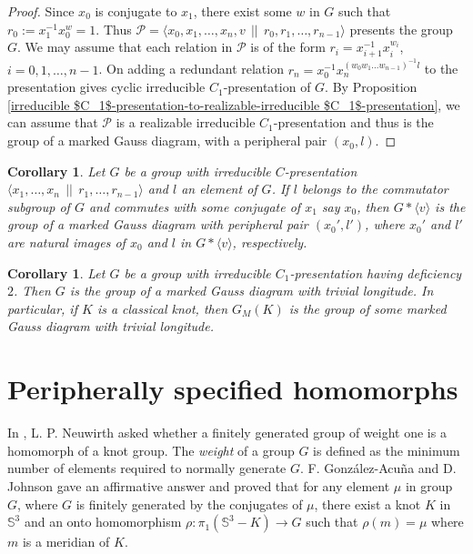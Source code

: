 \documentclass[11 pt, reqno]{amsart}
\newtheorem{corollary}[theorem]{Corollary}
\theoremstyle{definition}
\numberwithin{equation}{subsection}
\begin{document}
\begin{proof}
Since $x_0$ is conjugate to $x_1$, there exist some $w$ in $G$ such that $r_0:=x_1^{-1}x_0^{w}=1$. Thus $\mathcal{P}=\langle x_0,x_1, \ldots, x_n, v~~||~~r_0,r_1, \ldots, r_{n-1} \rangle$ presents the group $G$. We may assume that each relation in $\mathcal{P}$ is of the form $r_i=x_{i+1}^{-1}x_i^{w_i}$, $i=0,1, \ldots, n-1$. On adding a redundant relation $r_n=x_0^{-1}x_n^{(w_0 w_1 \ldots w_{n-1})^{-1}l}$ to the presentation gives cyclic irreducible $C_1$-presentation of $G$. By Proposition \ref{irreducible $C_1$-presentation-to-realizable-irreducible $C_1$-presentation}, we can assume that $\mathcal{P}$ is a realizable irreducible $C_1$-presentation and thus is the group of a marked Gauss diagram, with a peripheral pair $(x_0, l)$.
\end{proof}

\begin{corollary}
Let $G$ be a group with irreducible $C$-presentation $\langle x_1, \ldots, x_n~~||~~r_1, \ldots, r_{n-1} \rangle$ and $l$ an element of $G$. If $l$ belongs to the commutator subgroup of $G$ and commutes with some conjugate of $x_1$ say $x_0$, then $G * \langle v \rangle$ is the group of a marked Gauss diagram with peripheral pair $(x_0', l')$, where $x_0'$ and $l'$ are natural images of $x_0$ and $l$ in $G * \langle v \rangle$, respectively.
\end{corollary}

\begin{corollary}
Let $G$ be a group with irreducible $C_1$-presentation having deficiency $2$. Then $G$ is the group of a marked Gauss diagram with trivial longitude. In particular, if $K$ is a classical knot, then $G_M(K)$ is the group of some marked Gauss diagram with trivial longitude.
\end{corollary}



\section{Peripherally specified homomorphs}\label{S: Peripherally specified homomorphs}
In \cite{Neuwirth-1}, L. P. Neuwirth asked whether a finitely generated group of weight one is a homomorph of a knot group. The {\it weight} of a group $G$ is defined as the minimum number of elements required to normally generate $G$. F. Gonz{\'a}lez-Acu{\~n}a \cite{Acuna-1} and D. Johnson \cite{Johnson-1} gave an affirmative answer and proved that for any element $\mu$ in group $G$, where $G$ is finitely generated by the conjugates of $\mu$, there exist a knot $K$ in $\mathbb{S}^3$  and an onto homomorphism $\rho: \pi_1(\mathbb{S}^3 - K) \to G$ such that $\rho(m)=\mu$ where $m$ is a meridian of $K$.
\par
\end{document}
